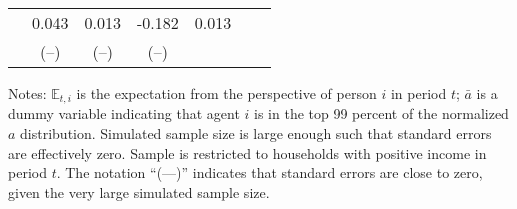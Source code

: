 \begin{table}[t]
\begin{center}
{\begin{tabular}{cd{4}d{4}d{5}ccc}
\\ &  0.043  &    0.013    &     -0.182   & 0.013 &    
\\ &  &   &    &  &   %
\\ \bottomrule  
\end{tabular}  
}\usebox{\crosssecond} 
\settowidth{\TableWidth}{\usebox{\crosssecond}} %
\medskip\medskip \parbox{\TableWidth}{\small Notes: $\mathbb{E}_{t,i}$ is the expectation from the perspective of person $i$ in period $t$; $\bar{a}$ is a dummy variable indicating that agent $i$ is in the top 99 percent of the normalized $a$ distribution.  Simulated sample size is large enough such that standard errors are effectively zero.  Sample is restricted to households with positive income in period $t$. The notation ``(---)'' indicates that standard errors are close to zero, given the very large simulated sample size.}  
\end{center} 
\end{table} 
